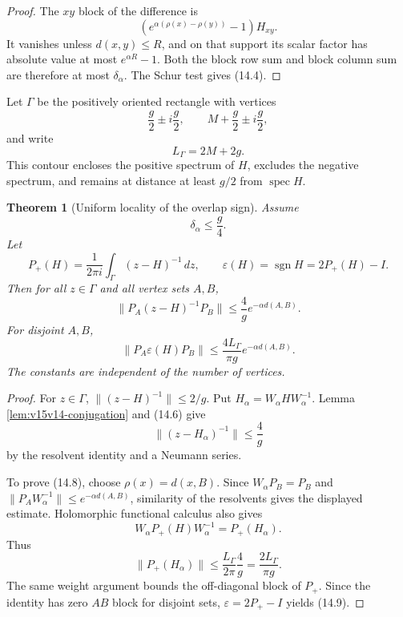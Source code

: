 \documentclass[11pt]{article}
\newtheorem{theorem}{Theorem}[section]
\theoremstyle{remark}
\begin{document}
\begin{proof}
The \(xy\) block of the difference is
\[
 \left(e^{\alpha(\rho(x)-\rho(y))}-1\right)H_{xy}.
\]
It vanishes unless \(d(x,y)\le R\), and on that support its
scalar factor has absolute value at most \(e^{\alpha R}-1\).
Both the block row sum and block column sum are therefore at
most \(\delta_\alpha\).  The Schur test gives (14.4).
\end{proof}

Let \(\Gamma\) be the positively oriented rectangle with vertices
\[
 \frac g2\pm i\frac g2,\qquad
 M+\frac g2\pm i\frac g2,
\]
and write
\[
 L_\Gamma=2M+2g.                                             \tag{14.5}
\]
This contour encloses the positive spectrum of \(H\), excludes the
negative spectrum, and remains at distance at least \(g/2\) from
\(\operatorname{spec}H\).

\begin{theorem}[Uniform locality of the overlap sign]
\label{thm:v15v14-sign}
Assume
\[
 \delta_\alpha\le\frac g4.                                  \tag{14.6}
\]
Let
\[
 P_+(H)=\frac{1}{2\pi i}\int_\Gamma(z-H)^{-1}\,dz,
 \qquad
 \varepsilon(H)=\operatorname{sgn}H=2P_+(H)-I.               \tag{14.7}
\]
Then for all \(z\in\Gamma\) and all vertex sets \(A,B\),
\[
 \|P_A(z-H)^{-1}P_B\|
 \le\frac4g e^{-\alpha d(A,B)}.                             \tag{14.8}
\]
For disjoint \(A,B\),
\[
 \boxed{
 \|P_A\varepsilon(H)P_B\|
 \le\frac{4L_\Gamma}{\pi g}
 e^{-\alpha d(A,B)}.}                                      \tag{14.9}
\]
The constants are independent of the number of vertices.
\end{theorem}

\begin{proof}
For \(z\in\Gamma\),
\(\|(z-H)^{-1}\|\le2/g\).  Put
\(H_\alpha=W_\alpha H W_\alpha^{-1}\).  Lemma
\ref{lem:v15v14-conjugation} and (14.6) give
\[
 \|(z-H_\alpha)^{-1}\|\le\frac4g                            \tag{14.10}
\]
by the resolvent identity and a Neumann series.

To prove (14.8), choose
\(\rho(x)=d(x,B)\).  Since \(W_\alpha P_B=P_B\) and
\(\|P_AW_\alpha^{-1}\|\le e^{-\alpha d(A,B)}\), similarity
of the resolvents gives the displayed estimate.  Holomorphic
functional calculus also gives
\[
 W_\alpha P_+(H)W_\alpha^{-1}=P_+(H_\alpha).
\]
Thus
\[
 \|P_+(H_\alpha)\|
 \le\frac{L_\Gamma}{2\pi}\frac4g
 =\frac{2L_\Gamma}{\pi g}.                                 \tag{14.11}
\]
The same weight argument bounds the off-diagonal block of \(P_+\).
Since the identity has zero \(AB\) block for disjoint sets,
\(\varepsilon=2P_+-I\) yields (14.9).
\end{proof}
\end{document}

